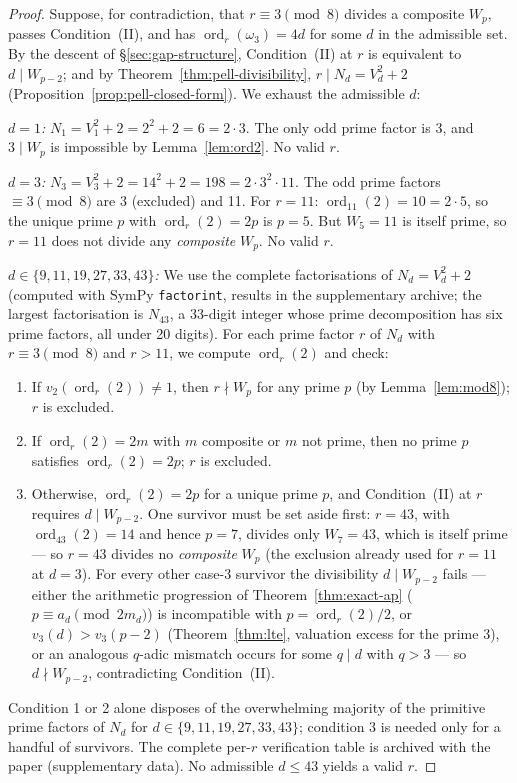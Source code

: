 \documentclass[11pt]{amsart}
\theoremstyle{plain}
\theoremstyle{definition}
\theoremstyle{remark}
\numberwithin{equation}{section}
\newcommand{\ord}{\operatorname{ord}}
\begin{document}
\begin{proof}
Suppose, for contradiction, that $r \equiv 3 \pmod 8$ divides a composite $W_p$, passes Condition~(II), and has $\ord_r(\omega_3) = 4 d$ for some $d$ in the admissible set. By the descent of \S\ref{sec:gap-structure}, Condition~(II) at $r$ is equivalent to $d \mid W_{p-2}$; and by Theorem~\ref{thm:pell-divisibility}, $r \mid N_d = V_d^2 + 2$ (Proposition~\ref{prop:pell-closed-form}). We exhaust the admissible $d$:

\emph{$d = 1$:} $N_1 = V_1^2 + 2 = 2^2 + 2 = 6 = 2 \cdot 3$. The only odd prime factor is 3, and $3 \mid W_p$ is impossible by Lemma~\ref{lem:ord2}. No valid $r$.

\emph{$d = 3$:} $N_3 = V_3^2 + 2 = 14^2 + 2 = 198 = 2 \cdot 3^2 \cdot 11$. The odd prime factors $\equiv 3 \pmod 8$ are 3 (excluded) and 11. For $r = 11$: $\ord_{11}(2) = 10 = 2 \cdot 5$, so the unique prime $p$ with $\ord_r(2) = 2 p$ is $p = 5$. But $W_5 = 11$ is itself prime, so $r = 11$ does not divide any \emph{composite} $W_p$. No valid $r$.

\emph{$d \in \{9, 11, 19, 27, 33, 43\}$:} We use the complete factorisations of $N_d = V_d^2 + 2$ (computed with SymPy \texttt{factorint}, results in the supplementary archive; the largest factorisation is $N_{43}$, a 33-digit integer whose prime decomposition has six prime factors, all under 20 digits). For each prime factor $r$ of $N_d$ with $r \equiv 3 \pmod 8$ and $r > 11$, we compute $\ord_r(2)$ and check:
\begin{enumerate}
\item If $v_2(\ord_r(2)) \neq 1$, then $r \nmid W_p$ for any prime $p$ (by Lemma~\ref{lem:mod8}); $r$ is excluded.
\item If $\ord_r(2) = 2 m$ with $m$ composite or $m$ not prime, then no prime $p$ satisfies $\ord_r(2) = 2 p$; $r$ is excluded.
\item Otherwise, $\ord_r(2) = 2 p$ for a unique prime $p$, and Condition~(II) at $r$ requires $d \mid W_{p-2}$. One survivor must be set aside first: $r = 43$, with $\ord_{43}(2) = 14$ and hence $p = 7$, divides only $W_7 = 43$, which is itself prime --- so $r = 43$ divides no \emph{composite} $W_p$ (the exclusion already used for $r = 11$ at $d = 3$). For every other case-3 survivor the divisibility $d \mid W_{p-2}$ fails --- either the arithmetic progression of Theorem~\ref{thm:exact-ap} ($p \equiv a_d \pmod{2 m_d}$) is incompatible with $p = \ord_r(2)/2$, or $v_3(d) > v_3(p-2)$ (Theorem~\ref{thm:lte}, valuation excess for the prime 3), or an analogous $q$-adic mismatch occurs for some $q \mid d$ with $q > 3$ --- so $d \nmid W_{p-2}$, contradicting Condition~(II).
\end{enumerate}
Condition 1 or 2 alone disposes of the overwhelming majority of the primitive prime factors of $N_d$ for $d \in \{9, 11, 19, 27, 33, 43\}$; condition 3 is needed only for a handful of survivors. The complete per-$r$ verification table is archived with the paper (supplementary data). No admissible $d \leq 43$ yields a valid $r$.


\end{proof}
\end{document}
